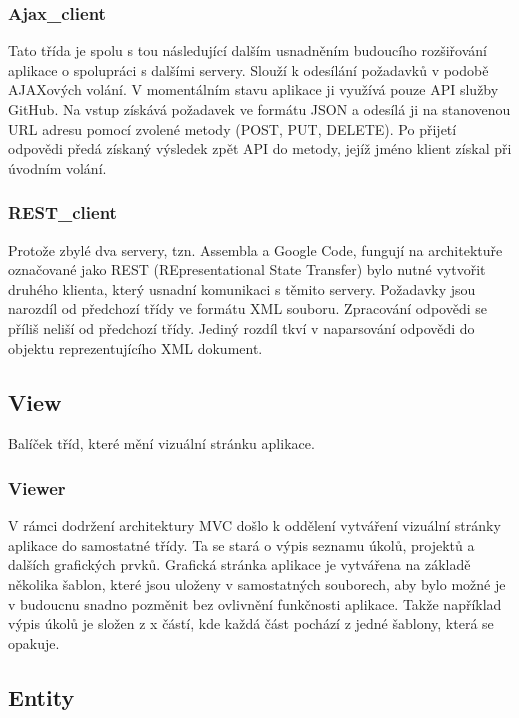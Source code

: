 \subsubsection{Ajax\_client}

Tato třída je spolu s tou následující dalším usnadněním budoucího rozšiřování aplikace o spolupráci s dalšími servery. Slouží k odesílání požadavků v podobě AJAXových volání. V momentálním stavu aplikace ji využívá pouze API služby GitHub. Na vstup získává požadavek ve formátu JSON a odesílá ji na stanovenou URL adresu pomocí zvolené metody (POST, PUT, DELETE). Po přijetí odpovědi předá získaný výsledek zpět API do metody, jejíž jméno klient získal při úvodním volání.

\subsubsection{REST\_client}

Protože zbylé dva servery, tzn. Assembla a Google Code, fungují na architektuře označované jako REST (REpresentational State Transfer) bylo nutné vytvořit druhého klienta, který usnadní komunikaci s těmito servery. Požadavky jsou narozdíl od předchozí třídy ve formátu XML souboru. Zpracování odpovědi se příliš neliší od předchozí třídy. Jediný rozdíl tkví v naparsování odpovědi do objektu reprezentujícího XML dokument.

\subsection{View}

Balíček tříd, které mění vizuální stránku aplikace.

\subsubsection{Viewer}

V rámci dodržení architektury MVC došlo k oddělení vytváření vizuální stránky aplikace do samostatné třídy. Ta se stará o výpis seznamu úkolů, projektů a dalších grafických prvků. Grafická stránka aplikace je vytvářena na základě několika šablon, které jsou uloženy v samostatných souborech, aby bylo možné je v budoucnu snadno pozměnit bez ovlivnění funkčnosti aplikace. Takže například výpis úkolů je složen z x částí, kde každá část pochází z jedné šablony, která se opakuje.

\subsection{Entity}

